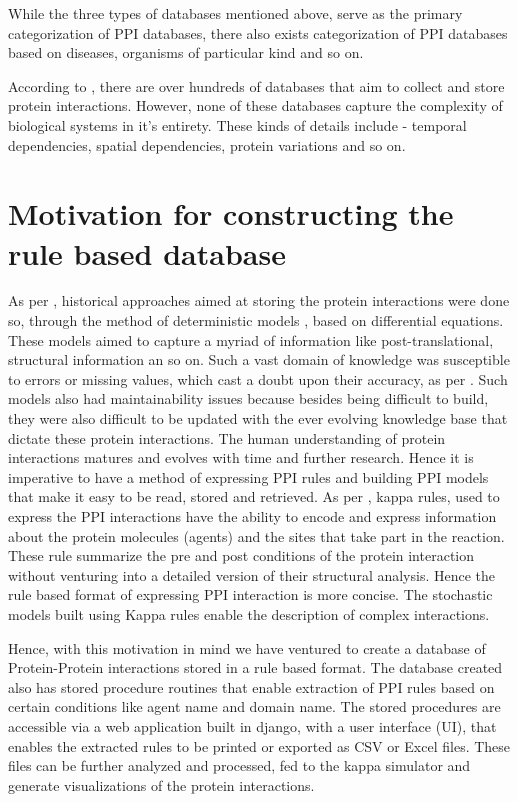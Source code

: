 \documentclass[msc,deptreport,ai]{infthesis}      %
\begin{document}
While the three types of databases mentioned above, serve as the primary categorization of PPI databases, there also exists categorization of PPI databases based on diseases, organisms of particular kind and so on.

According to \cite{typesOfPPIdb}, there are over hundreds of databases that aim to collect and store protein interactions. However, none of these databases capture the complexity of biological systems in it's entirety. These kinds of details include - temporal dependencies, spatial dependencies, protein variations and so on.

\section{Motivation for constructing the rule based database}
As per \cite{kappaPlatform}, historical approaches aimed at storing the protein interactions were done so, through the method of deterministic models , based on differential equations. These models aimed to capture a myriad of information like post-translational, structural information an so on. Such a vast domain of knowledge was susceptible to errors or missing values, which cast a doubt upon their accuracy, as per \cite{kappaPlatform}. Such models also had maintainability issues because besides being difficult to build, they were also difficult to be updated with the ever evolving knowledge base that dictate these protein interactions. The human understanding of protein interactions matures and evolves with time and further research. Hence it is imperative to have a method of expressing PPI rules and building PPI models that make it easy to be read, stored and retrieved. As per \cite{kappaPlatform}, kappa rules, used to express the PPI interactions have the ability to encode and express information about the protein molecules (agents) and the sites that take part in the reaction. These rule summarize the pre and post conditions of the protein interaction without venturing into a detailed version of their structural analysis. Hence the rule based format of expressing PPI interaction is more concise. The stochastic models built using Kappa rules enable the description of complex interactions.

Hence, with this motivation in mind we have ventured to create a database of Protein-Protein interactions stored in a rule based format. The database created also has stored procedure routines that enable extraction of PPI rules based on certain conditions like agent name and domain name. The stored procedures are accessible via a web application built in django, with a user interface (UI), that enables the extracted rules to be printed or exported as CSV or Excel files. These files can be further analyzed and processed, fed to the kappa simulator \cite{kasim} and generate visualizations of the protein interactions.
\end{document}
